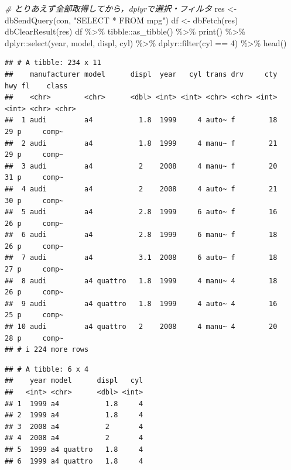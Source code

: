 \documentclass[
]{article}
\newenvironment{Shaded}{\begin{snugshade}}{\end{snugshade}}
\newcommand{\CommentTok}[1]{\textcolor[rgb]{0.56,0.35,0.01}{\textit{#1}}}
\newcommand{\DecValTok}[1]{\textcolor[rgb]{0.00,0.00,0.81}{#1}}
\newcommand{\FunctionTok}[1]{\textcolor[rgb]{0.00,0.00,0.00}{#1}}
\newcommand{\NormalTok}[1]{#1}
\newcommand{\OtherTok}[1]{\textcolor[rgb]{0.56,0.35,0.01}{#1}}
\newcommand{\SpecialCharTok}[1]{\textcolor[rgb]{0.00,0.00,0.00}{#1}}
\newcommand{\StringTok}[1]{\textcolor[rgb]{0.31,0.60,0.02}{#1}}
\begin{document}
\begin{Shaded}
\begin{Highlighting}[]
  \CommentTok{\# とりあえず全部取得してから，dplyrで選択・フィルタ}
\NormalTok{res }\OtherTok{\textless{}{-}} \FunctionTok{dbSendQuery}\NormalTok{(con, }\StringTok{"SELECT * FROM mpg"}\NormalTok{)}
\NormalTok{df }\OtherTok{\textless{}{-}} \FunctionTok{dbFetch}\NormalTok{(res)}
\FunctionTok{dbClearResult}\NormalTok{(res)}
\NormalTok{df }\SpecialCharTok{\%\textgreater{}\%}
\NormalTok{  tibble}\SpecialCharTok{::}\FunctionTok{as\_tibble}\NormalTok{() }\SpecialCharTok{\%\textgreater{}\%}
  \FunctionTok{print}\NormalTok{() }\SpecialCharTok{\%\textgreater{}\%}
\NormalTok{  dplyr}\SpecialCharTok{::}\FunctionTok{select}\NormalTok{(year, model, displ, cyl) }\SpecialCharTok{\%\textgreater{}\%}
\NormalTok{  dplyr}\SpecialCharTok{::}\FunctionTok{filter}\NormalTok{(cyl }\SpecialCharTok{==} \DecValTok{4}\NormalTok{) }\SpecialCharTok{\%\textgreater{}\%}
  \FunctionTok{head}\NormalTok{()}
\end{Highlighting}
\end{Shaded}

\begin{verbatim}
## # A tibble: 234 x 11
##    manufacturer model      displ  year   cyl trans drv     cty   hwy fl    class
##    <chr>        <chr>      <dbl> <int> <int> <chr> <chr> <int> <int> <chr> <chr>
##  1 audi         a4           1.8  1999     4 auto~ f        18    29 p     comp~
##  2 audi         a4           1.8  1999     4 manu~ f        21    29 p     comp~
##  3 audi         a4           2    2008     4 manu~ f        20    31 p     comp~
##  4 audi         a4           2    2008     4 auto~ f        21    30 p     comp~
##  5 audi         a4           2.8  1999     6 auto~ f        16    26 p     comp~
##  6 audi         a4           2.8  1999     6 manu~ f        18    26 p     comp~
##  7 audi         a4           3.1  2008     6 auto~ f        18    27 p     comp~
##  8 audi         a4 quattro   1.8  1999     4 manu~ 4        18    26 p     comp~
##  9 audi         a4 quattro   1.8  1999     4 auto~ 4        16    25 p     comp~
## 10 audi         a4 quattro   2    2008     4 manu~ 4        20    28 p     comp~
## # i 224 more rows
\end{verbatim}

\begin{verbatim}
## # A tibble: 6 x 4
##    year model      displ   cyl
##   <int> <chr>      <dbl> <int>
## 1  1999 a4           1.8     4
## 2  1999 a4           1.8     4
## 3  2008 a4           2       4
## 4  2008 a4           2       4
## 5  1999 a4 quattro   1.8     4
## 6  1999 a4 quattro   1.8     4
\end{verbatim}
\end{document}
